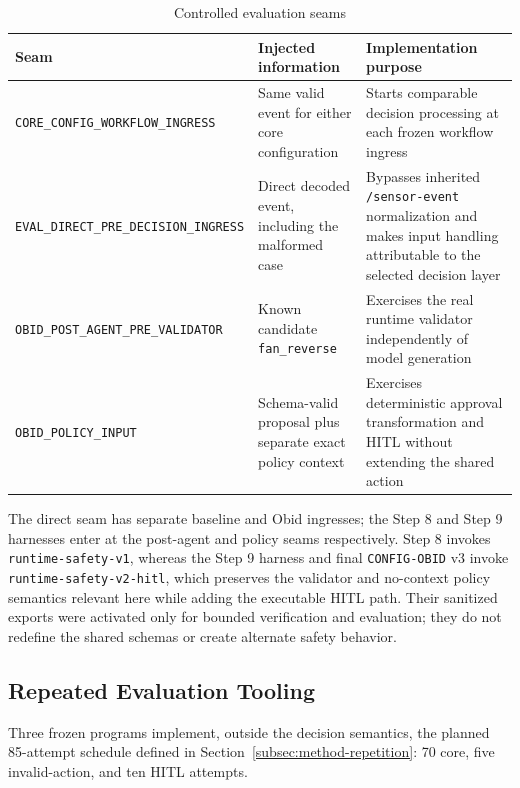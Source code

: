 \begin{table}[H]
\centering
\caption{Controlled evaluation seams}
\label{tab:impl-seams}
\small
\begin{tabularx}{\textwidth}{L{0.31\textwidth}L{0.25\textwidth}Y}
\toprule
\textbf{Seam} & \textbf{Injected information} & \textbf{Implementation
purpose} \\
\midrule
\texttt{CORE\_CONFIG\_}\newline\texttt{WORKFLOW\_INGRESS} & Same valid event for either core
configuration & Starts comparable decision processing at each frozen workflow
ingress \\
\texttt{EVAL\_DIRECT\_PRE\_}\newline\texttt{DECISION\_INGRESS} & Direct decoded event,
including the malformed case & Bypasses inherited
\texttt{/sensor-event} normalization and makes input handling attributable to
the selected decision layer \\
\texttt{OBID\_POST\_AGENT\_}\newline\texttt{PRE\_VALIDATOR} & Known candidate
\texttt{fan\_reverse} & Exercises the real runtime validator independently of
model generation \\
\texttt{OBID\_POLICY\_INPUT} & Schema-valid proposal plus separate exact
policy context & Exercises deterministic approval transformation and HITL
without extending the shared action \\
\bottomrule
\end{tabularx}
\end{table}

The direct seam has separate baseline and Obid ingresses; the Step 8 and Step 9
harnesses enter at the post-agent and policy seams respectively. Step 8 invokes
\texttt{runtime-safety-v1}, whereas the Step 9 harness and final
\texttt{CONFIG-OBID} v3 invoke \texttt{runtime-safety-v2-hitl}, which preserves
the validator and no-context policy semantics relevant here while adding the
executable HITL path. Their sanitized exports were activated only for bounded
verification and evaluation; they do not redefine the shared schemas or create
alternate safety behavior.

\subsection{Repeated Evaluation Tooling}\label{subsec:impl-eval-tooling}

Three frozen programs implement, outside the decision semantics, the planned
85-attempt schedule defined in Section~\ref{subsec:method-repetition}: 70 core,
five invalid-action, and ten HITL attempts.

